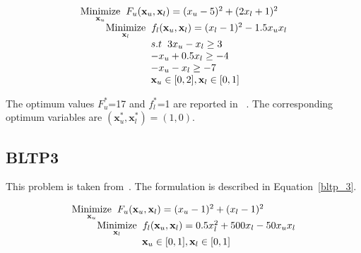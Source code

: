 \begin{equation}
\begin{array}{lr}
\underset{\mathbf{x}_u}{\text{Minimize}}\hspace{2mm} F_u(\mathbf{x}_u, \mathbf{ x}_l)=(x_u-5)^2+(2x_l+1)^2\\

\hspace{9mm} \underset{\mathbf{x}_l} {\text{Minimize}}\hspace{2mm} f_l(\mathbf{x}_u, \mathbf{ x}_l)=(x_l-1)^2-1.5 x_u x_l \\
\hspace{25mm}s.t\hspace{2mm} 3x_u-x_l \geq 3\\
\hspace{25mm} -x_u+0.5x_l \geq -4\\
\hspace{25mm} -x_u-x_l \geq -7\\

\hspace{25mm} \mathbf{x}_u \in {[0,2]},\mathbf{x}_l \in [0,1] \\
\end{array}
\label{bltp_2}
\end{equation}

The optimum values $F_u^*$=17 and  $f_l^*$=1 are reported in ~\cite{Angelobilevel}. The corresponding optimum variables are $(\mathbf{x}^*_u, \mathbf{x}^*_l)=(1,0).$

\subsection{BLTP3}

This problem is taken from~\cite{oduguwa2002bi,Angelobilevel}. The formulation is described in Equation~\ref{bltp_3}. 

\begin{equation}
\begin{array}{lr}
\underset{\mathbf{x}_u}{\text{Minimize}}\hspace{2mm} F_u(\mathbf{x}_u, \mathbf{ x}_l)=(x_u-1)^2+(x_l-1)^2\\

\hspace{9mm} \underset{\mathbf{x}_l} {\text{Minimize}}\hspace{2mm} f_l(\mathbf{x}_u, \mathbf{ x}_l)=0.5x_l^2+500x_l-50 x_u x_l \\
\hspace{25mm} \mathbf{x}_u \in {[0,1]},\mathbf{x}_l \in [0,1] \\

\end{array}
\label{bltp_3}
\end{equation}

